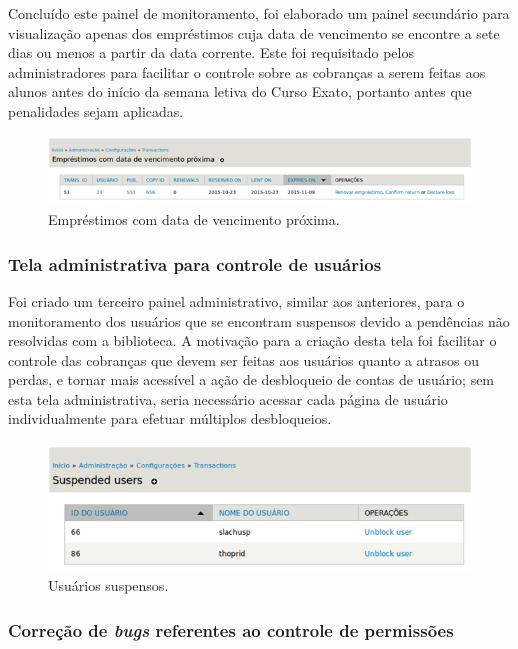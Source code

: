 \documentclass[a4paper]{article}
\begin{document}
Concluído este painel de monitoramento, foi elaborado um painel secundário para visualização apenas dos empréstimos cuja data de vencimento se encontre a sete dias ou menos a partir da data corrente. Este foi requisitado pelos administradores para facilitar o controle sobre as cobranças a serem feitas aos alunos antes do início da semana letiva do Curso Exato, portanto antes que penalidades sejam aplicadas.

\begin{figure}[pbth!]
\centering
\includegraphics[width=150mm]{img/expiring-soon.png}
\caption{Empréstimos com data de vencimento próxima.\label{expiring-soon}}
\end{figure}

\subsubsection{Tela administrativa para controle de usuários}

Foi criado um terceiro painel administrativo, similar aos anteriores, para o monitoramento dos usuários que se encontram suspensos devido a pendências não resolvidas com a biblioteca. A motivação para a criação desta tela foi facilitar o controle das cobranças que devem ser feitas aos usuários quanto a atrasos ou perdas, e tornar mais acessível a ação de desbloqueio de contas de usuário; sem esta tela administrativa, seria necessário acessar cada página de usuário individualmente para efetuar múltiplos desbloqueios.

\begin{figure}[pbth!]
\centering
\includegraphics[width=120mm]{img/suspended-users.png}
\caption{Usuários suspensos.\label{suspended-users}}
\end{figure}

\subsubsection{Correção de \textit{bugs} referentes ao controle de permissões}
    
\end{document}
